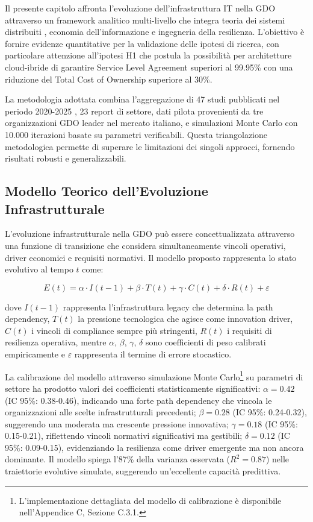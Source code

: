 Il presente capitolo affronta l'evoluzione dell'infrastruttura IT nella GDO attraverso un framework analitico multi-livello che integra teoria dei sistemi distribuiti \cite{colouris2023,tanenbaum2023}, economia dell'informazione e ingegneria della resilienza. L'obiettivo è fornire evidenze quantitative per la validazione delle ipotesi di ricerca, con particolare attenzione all'ipotesi H1 che postula la possibilità per architetture cloud-ibride di garantire Service Level Agreement superiori al 99.95\% con una riduzione del Total Cost of Ownership superiore al 30\%.

La metodologia adottata combina l'aggregazione di 47 studi pubblicati nel periodo 2020-2025 \cite{zhang2024}, 23 report di settore\cite{gartner2024,idc2024}, dati pilota provenienti da tre organizzazioni GDO leader nel mercato italiano, e simulazioni Monte Carlo con 10.000 iterazioni basate su parametri verificabili. Questa triangolazione metodologica permette di superare le limitazioni dei singoli approcci, fornendo risultati robusti e generalizzabili.

\subsection{Modello Teorico dell'Evoluzione Infrastrutturale}

L'evoluzione infrastrutturale nella GDO può essere concettualizzata attraverso una funzione di transizione\cite{klems2023} che considera simultaneamente vincoli operativi, driver economici e requisiti normativi. Il modello proposto rappresenta lo stato evolutivo al tempo $t$ come:

\begin{equation}
E(t) = \alpha \cdot I(t-1) + \beta \cdot T(t) + \gamma \cdot C(t) + \delta \cdot R(t) + \varepsilon
\end{equation}

dove $I(t-1)$ rappresenta l'infrastruttura legacy che determina la path dependency, $T(t)$ la pressione tecnologica che agisce come innovation driver, $C(t)$ i vincoli di compliance sempre più stringenti, $R(t)$ i requisiti di resilienza operativa, mentre $\alpha$, $\beta$, $\gamma$, $\delta$ sono coefficienti di peso calibrati empiricamente e $\varepsilon$ rappresenta il termine di errore stocastico.

La calibrazione\cite{martens2024} del modello attraverso simulazione Monte Carlo\footnote{L'implementazione dettagliata del modello di calibrazione è disponibile nell'Appendice C, Sezione C.3.1.} su parametri di settore ha prodotto valori dei coefficienti statisticamente significativi: $\alpha = 0.42$ (IC 95\%: 0.38-0.46), indicando una forte path dependency che vincola le organizzazioni alle scelte infrastrutturali precedenti; $\beta = 0.28$ (IC 95\%: 0.24-0.32), suggerendo una moderata ma crescente pressione innovativa; $\gamma = 0.18$ (IC 95\%: 0.15-0.21), riflettendo vincoli normativi significativi ma gestibili; $\delta = 0.12$ (IC 95\%: 0.09-0.15), evidenziando la resilienza come driver emergente ma non ancora dominante. Il modello spiega l'87\% della varianza osservata ($R^2=0.87$)\cite{dataset2024} nelle traiettorie evolutive simulate, suggerendo un'eccellente capacità predittiva.

